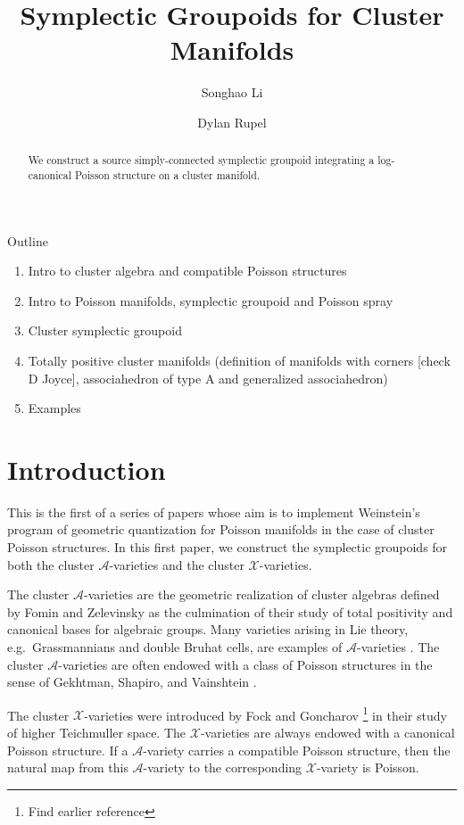 \documentclass{amsart}
\title{Symplectic Groupoids for Cluster Manifolds}
\author{Songhao Li}
\author{Dylan Rupel}
\numberwithin{equation}{section}
\newcommand{\cA}{\mathcal{A}}
\newcommand{\cX}{\mathcal{X}}
\begin{document}
\begin{abstract}
  We construct a source simply-connected symplectic groupoid integrating a log-canonical Poisson structure on a cluster manifold.
\end{abstract}
\maketitle
Outline
\begin{enumerate}
	\item Intro to cluster algebra and compatible Poisson structures 
	\item Intro to Poisson manifolds, symplectic groupoid and Poisson spray
	\item Cluster symplectic groupoid
	\item Totally positive cluster manifolds (definition of manifolds with corners [check D Joyce], associahedron of type A and generalized associahedron)
	\item Examples
\end{enumerate}

\section{Introduction}
This is the first of a series of papers whose aim is to implement Weinstein's program of geometric quantization for Poisson manifolds \cite{MR1104934} in the case of cluster Poisson structures. In this first paper, we construct the symplectic groupoids for both the cluster $\cA$-varieties and the cluster $\cX$-varieties. 

The cluster $\cA$-varieties are the geometric realization of cluster algebras defined by Fomin and Zelevinsky \cite{MR1887642} as the culmination of their study of total positivity and canonical bases for algebraic groups. Many varieties arising in Lie theory, e.g.\ Grassmannians and double Bruhat cells, are examples of $\cA$-varieties \cite{berenstein-fomin-zelevinsky,scott,gekhtman-shapiro-vainshtein,williams}. The cluster $\cA$-varieties are often endowed with a class of Poisson structures in the sense of Gekhtman, Shapiro, and Vainshtein \cite{MR2683456}.

The cluster $\cX$-varieties were introduced by Fock and Goncharov \cite{MR2470108}\footnote{Find earlier reference} in their study of higher Teichmuller space. The $\cX$-varieties are always endowed with a canonical Poisson structure. If a $\cA$-variety carries a compatible Poisson structure, then the natural map from this $\cA$-variety to the corresponding $\cX$-variety is Poisson.
\end{document}
